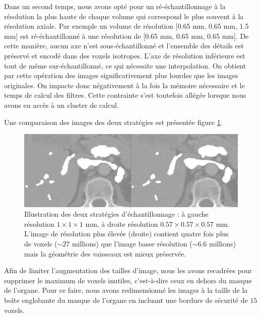 Dans un second temps, nous avons opté pour un ré-échantillonnage à la résolution la plus haute de chaque volume qui correspond le plus souvent à la résolution axiale. Par exemple un volume de résolution [0.65 mm, 0.65 mm, 1.5 mm] est ré-échantillonné à une résolution de [0.65 mm, 0.65 mm, 0.65 mm]. De cette manière, aucun axe n'est sous-échantillonné et l'ensemble des détails est préservé et encodé dans des voxels isotropes. L'axe de résolution inférieure est tout de même sur-échantillonné, ce qui nécessite une interpolation. On obtient par cette opération des images significativement plus lourdes que les images originales. On impacte donc négativement à la fois la mémoire nécessaire et le temps de calcul des filtres. Cette contrainte s'est toutefois allégée lorsque nous avons eu accès à un cluster de calcul.

Une comparaison des images des deux stratégies est présentée figure \ref{fig:resolution_comparison}.
\begin{figure}[!ht]
  \centering
  \includegraphics[width=\textwidth]{Images/resolution_111_xxx.png}
  \caption{Illustration des deux stratégies d'échantillonnage : à gauche résolution $1\times1\times1$ mm, à droite résolution $0.57\times0.57\times0.57$ mm. L'image de résolution plus élevée (droite) contient quatre fois plus de voxels ($\sim 27$ millions) que l'image basse résolution ($\sim 6.6$ millions) mais la géométrie des vaisseaux est mieux préservée.}
  \label{fig:resolution_comparison}
\end{figure}
Afin de limiter l'augmentation des tailles d'image, nous les avons recadrées pour supprimer le maximum de voxels inutiles, c'est-à-dire ceux en dehors du masque de l'organe. Pour ce faire, nous avons redimensionné les images à la taille de la boîte englobante du masque de l'organe en incluant une bordure de sécurité de $15$ voxels. 

